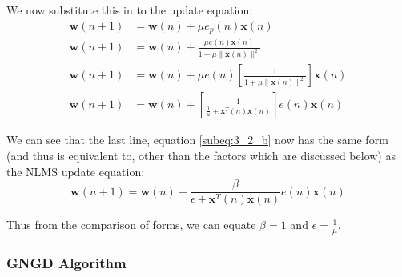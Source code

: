 \documentclass[./main.tex]{subfiles}
\begin{document}
We now substitute this in to the update equation:
\begin{subequations}
	\begin{align}
	\mathbf{w}(n+1) &= \mathbf{w}(n) + \mu e_p(n) \mathbf{x}(n) \\
	\mathbf{w}(n+1) &= \mathbf{w}(n) + \frac{\mu e(n) \mathbf{x}(n)}{1 + \mu \lVert \mathbf{x}(n) \rVert^2 } \\
	\mathbf{w}(n+1) &= \mathbf{w}(n) + \mu e(n) \left[ \frac{ 1 }{1 + \mu \lVert \mathbf{x}(n) \rVert^2} \right] \mathbf{x}(n) \\
	\mathbf{w}(n+1) &= \mathbf{w}(n) + \left[ \frac{1}{\frac{1}{\mu} + \mathbf{x}^T(n)\mathbf{x}(n) } \right] e(n) \mathbf{x}(n)  \label{subeq:3_2_b}	\end{align}
\end{subequations}

We can see that the last line, equation \ref{subeq:3_2_b} now has the same form (and thus is equivalent to, other than the factors which are discussed below) as the NLMS update equation:
$$ \mathbf{w}(n+1) = \mathbf{w}(n) + \frac{\beta}{\epsilon + \mathbf{x}^T(n)\mathbf{x}(n)} e(n) \mathbf{x}(n) $$

Thus from the comparison of forms, we can equate $ \beta = 1 $ and $ \epsilon = \frac{1}{\mu} $.

\subsubsection{GNGD Algorithm}
\end{document}
